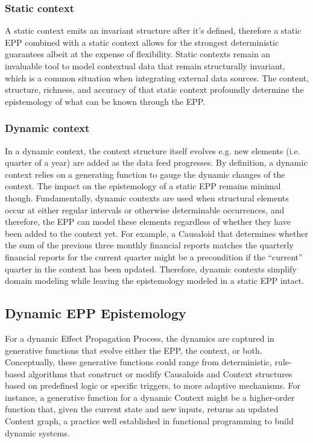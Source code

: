 \documentclass{article}
\begin{document}
\subsubsection{Static context}

A static context emits an invariant structure after it's defined, therefore a static EPP combined with a static context allows for the strongest deterministic guarantees albeit at the expense of flexibility. Static contexts remain an invaluable tool to model contextual data that remain structurally invariant, which is a common situation when integrating external data sources. The content, structure, richness, and accuracy of that static context profoundly determine the epistemology of what can be known through the EPP.

\subsubsection{Dynamic context}

In a dynamic context, the context structure itself evolves e.g. new elements (i.e. quarter of a year) are added as the data feed progresses. By definition, a dynamic context relies on a generating function to gauge the dynamic changes of the context. The impact on the epistemology of a static EPP remains minimal though. Fundamentally, dynamic contexts are used when structural elements occur at either regular intervals or otherwise determinable occurrences, and therefore, the EPP can model these elements regardless of whether they have been added to the context yet. For example, a Causaloid that determines whether the sum of the previous three monthly financial reports matches the quarterly financial reports for the current quarter might be a precondition if the “current” quarter in the context has been updated. Therefore, dynamic contexts simplify domain modeling while leaving the epistemology modeled in a static EPP intact.

\subsection{Dynamic EPP Epistemology}
\label{subsec:Dynamic_EPP}

For a dynamic Effect Propagation Process, the dynamics are captured in generative functions that evolve either the EPP, the context, or both. Conceptually, these generative functions could range from deterministic, rule-based algorithms that construct or modify Causaloids and Context structures based on predefined logic or specific triggers, to more adaptive mechanisms. For instance, a generative function for a dynamic Context might be a higher-order function that, given the current state and new inputs, returns an updated Context graph, a practice well established in functional programming to build dynamic systems.
\end{document}
